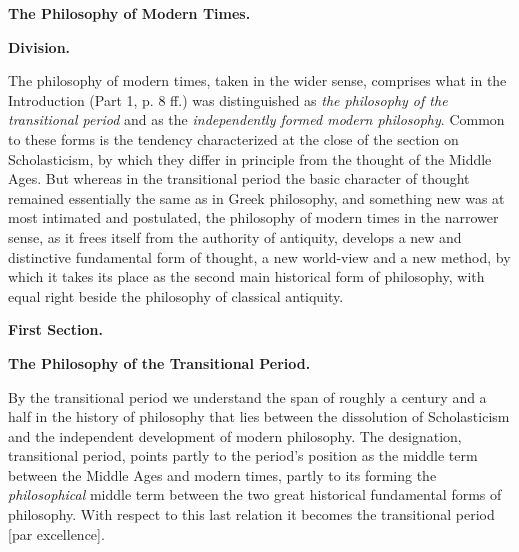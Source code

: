 \begin{center}
  \textbf{\large The Philosophy of Modern Times.}
\end{center}

\divrule

\begin{center}
  \textbf{Division.}
\end{center}

The philosophy of modern times, taken in the wider sense, comprises
what in the Introduction (Part 1, p. 8 ff.) was distinguished as
\emph{the philosophy of the transitional period} and as the
\emph{independently formed modern philosophy}. Common to these
forms is the tendency characterized at the close of the section on
Scholasticism, by which they differ in principle from the thought of
the Middle Ages. But whereas in the transitional period the basic
character of thought remained essentially the same as in Greek
philosophy, and something new was at most intimated and postulated,
the philosophy of modern times in the narrower sense, as it frees
itself from the authority of antiquity, develops a new and distinctive
fundamental form of thought, a new world-view and a new method, by
which it takes its place as the second main historical form of
philosophy, with equal right beside the philosophy of classical
antiquity.

\divrule

\begin{center}
  \textbf{\large First Section.}
\end{center}

\divrule

\begin{center}
  \textbf{The Philosophy of the Transitional Period.}
\end{center}

\divrule

By the transitional period we understand the span of roughly a
century and a half in the history of philosophy that lies between the
dissolution of Scholasticism and the independent development of modern
philosophy. The designation, transitional period, points partly to the
period's position as the middle term between the Middle Ages and modern
times, partly to its forming the \emph{philosophical} middle term
between the two great historical fundamental forms of philosophy. With
respect to this last relation it becomes the transitional period
 [par excellence].

